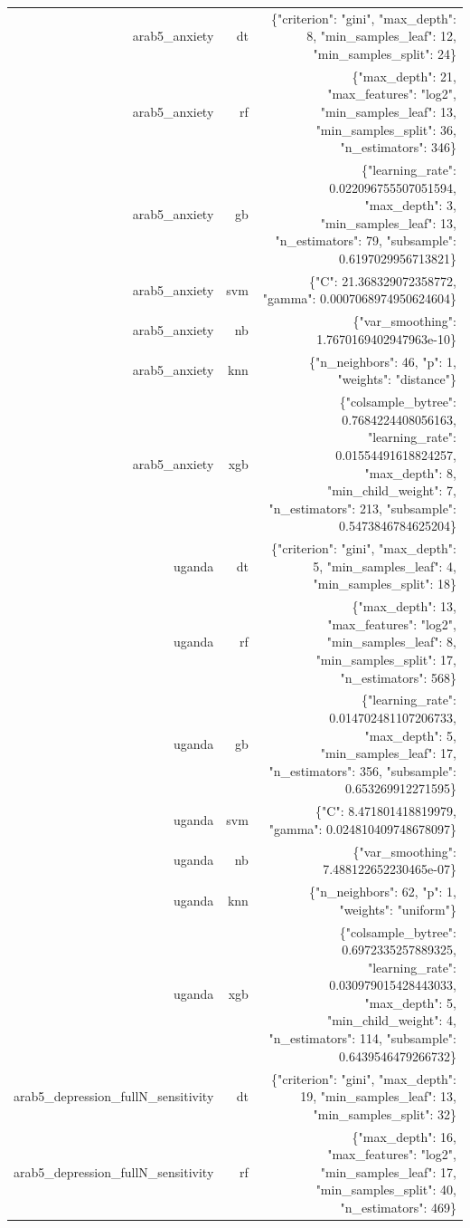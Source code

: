 \documentclass[10pt]{article}
\begin{document}
\begin{longtable}{rrr}
arab5\_anxiety & dt & \{"criterion": "gini", "max\_depth": 8, "min\_samples\_leaf": 12, "min\_samples\_split": 24\} \\
arab5\_anxiety & rf & \{"max\_depth": 21, "max\_features": "log2", "min\_samples\_leaf": 13, "min\_samples\_split": 36, "n\_estimators": 346\} \\
arab5\_anxiety & gb & \{"learning\_rate": 0.022096755507051594, "max\_depth": 3, "min\_samples\_leaf": 13, "n\_estimators": 79, "subsample": 0.6197029956713821\} \\
arab5\_anxiety & svm & \{"C": 21.368329072358772, "gamma": 0.0007068974950624604\} \\
arab5\_anxiety & nb & \{"var\_smoothing": 1.7670169402947963e-10\} \\
arab5\_anxiety & knn & \{"n\_neighbors": 46, "p": 1, "weights": "distance"\} \\
arab5\_anxiety & xgb & \{"colsample\_bytree": 0.7684224408056163, "learning\_rate": 0.01554491618824257, "max\_depth": 8, "min\_child\_weight": 7, "n\_estimators": 213, "subsample": 0.5473846784625204\} \\
uganda & dt & \{"criterion": "gini", "max\_depth": 5, "min\_samples\_leaf": 4, "min\_samples\_split": 18\} \\
uganda & rf & \{"max\_depth": 13, "max\_features": "log2", "min\_samples\_leaf": 8, "min\_samples\_split": 17, "n\_estimators": 568\} \\
uganda & gb & \{"learning\_rate": 0.014702481107206733, "max\_depth": 5, "min\_samples\_leaf": 17, "n\_estimators": 356, "subsample": 0.653269912271595\} \\
uganda & svm & \{"C": 8.471801418819979, "gamma": 0.024810409748678097\} \\
uganda & nb & \{"var\_smoothing": 7.488122652230465e-07\} \\
uganda & knn & \{"n\_neighbors": 62, "p": 1, "weights": "uniform"\} \\
uganda & xgb & \{"colsample\_bytree": 0.6972335257889325, "learning\_rate": 0.030979015428443033, "max\_depth": 5, "min\_child\_weight": 4, "n\_estimators": 114, "subsample": 0.6439546479266732\} \\
arab5\_depression\_fullN\_sensitivity & dt & \{"criterion": "gini", "max\_depth": 19, "min\_samples\_leaf": 13, "min\_samples\_split": 32\} \\
arab5\_depression\_fullN\_sensitivity & rf & \{"max\_depth": 16, "max\_features": "log2", "min\_samples\_leaf": 17, "min\_samples\_split": 40, "n\_estimators": 469\} \\

\end{longtable}
\end{document}
